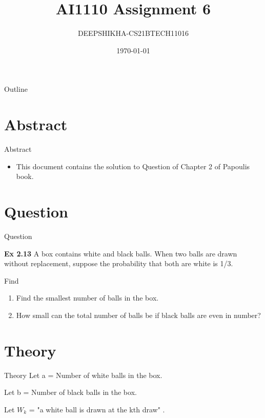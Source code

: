 \documentclass{beamer}
\title{AI1110 Assignment 6}
\author{DEEPSHIKHA-CS21BTECH11016}
\date{\today}
\begin{document}
\begin{frame}
		\titlepage
	\end{frame}

\begin{frame}{Outline}
  \tableofcontents
\end{frame}
\section{Abstract}
	\begin{frame}{Abstract}
		\begin{itemize}
			\item 	This document contains the solution to Question of Chapter 2 of Papoulis book.
		\end{itemize}
	\end{frame}
	
	
	\section{Question}
	\begin{frame}{Question}
		\begin{block}{\textbf{ Ex 2.13}}
		A box contains white and black balls. When two balls are drawn without replacement,
suppose the probability that both are white is 1/3.
	
	Find
	\begin{enumerate}
	\item Find the smallest number of balls in the box.
	\item How small can the total number of balls be if black balls are even in number? 
	\end{enumerate}	 
		\end{block}
	
	\end{frame}
	
\section{Theory}
\begin{frame}{Theory}
Let a = Number of white balls in the box.


Let b = Number of black balls in the box.


Let $W_k$ = "a white ball is drawn at the kth draw" .
\end{frame}
\end{document}
